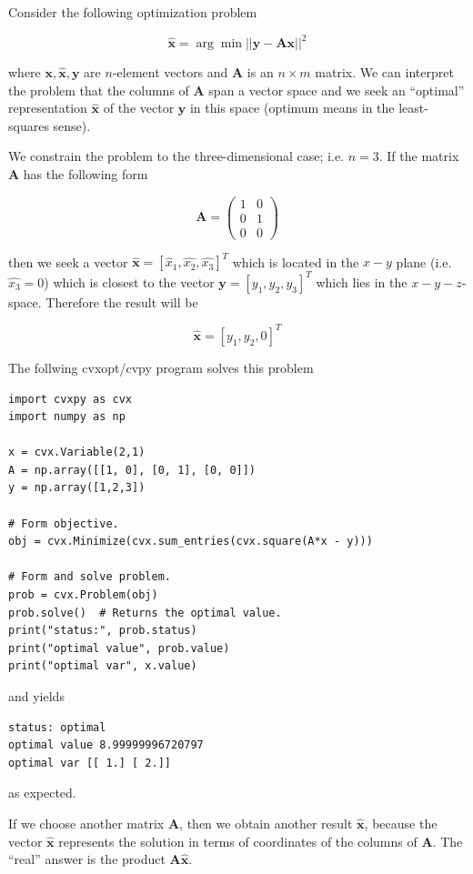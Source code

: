 
Consider the following optimization problem

\[
\hat{\mathbf{x}} = \arg \min || \mathbf{y} - \mathbf{Ax} ||^2
\]

where \(\mathbf{x,\hat{x}, y}\) are \(n\)-element vectors and \(\mathbf{A}\) is an \(n \times m\) matrix. We can interpret the problem that the columns of \(\mathbf{A}\) span a vector space and we seek an ``optimal'' representation \(\hat{\mathbf{x}}\) of the vector \(\mathbf{y}\) in this space (optimum means in the least-squares sense).

We constrain the problem to the three-dimensional case; i.e. \(n=3\). If the matrix \(\mathbf{A}\) has the following form

\[
\mathbf{A} = \begin{pmatrix} 1 & 0 \\ 0 & 1 \\ 0 & 0 \end{pmatrix}
\]

then we seek a vector \(\hat{\mathbf{x}} = [\hat{x}_1, \hat{x_2}, \hat{x_3} ]^T\) which is located in the \(x-y\) plane (i.e. \(\hat{x_3}=0\)) which is closest to the vector \(\mathbf{y} = [y_1, y_2, y_3]^T\) which lies in the \(x-y-z\)-space. Therefore the result will be

\[
\hat{\mathbf{x}} = [y_1, y_2, 0]^T
\]

The follwing cvxopt/cvpy program solves this problem

\begin{verbatim}
import cvxpy as cvx
import numpy as np

x = cvx.Variable(2,1)
A = np.array([[1, 0], [0, 1], [0, 0]])
y = np.array([1,2,3])

# Form objective.
obj = cvx.Minimize(cvx.sum_entries(cvx.square(A*x - y)))

# Form and solve problem.
prob = cvx.Problem(obj)
prob.solve()  # Returns the optimal value.
print("status:", prob.status)
print("optimal value", prob.value)
print("optimal var", x.value)
\end{verbatim}

and yields

\begin{verbatim}
status: optimal
optimal value 8.99999996720797
optimal var [[ 1.] [ 2.]]
\end{verbatim}

as expected.

If we choose another matrix \(\mathbf{A}\), then we obtain another result \(\hat{\mathbf{x}}\), because the vector \(\hat{\mathbf{x}}\) represents the solution in terms of coordinates of the columns of \(\mathbf{A}\). The ``real'' answer is the product $\mathbf{A}\hat{\mathbf{x}}$.

